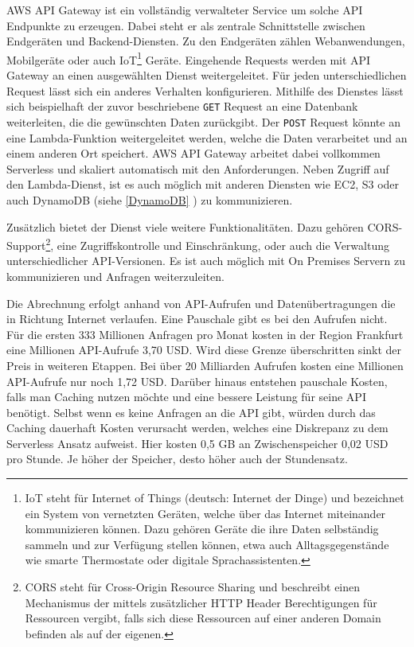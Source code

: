 AWS API Gateway ist ein vollständig verwalteter Service um solche API Endpunkte zu erzeugen.
Dabei steht er als zentrale Schnittstelle zwischen Endgeräten und Backend-Diensten.
Zu den Endgeräten zählen Webanwendungen, Mobilgeräte oder auch
IoT\footnote{IoT steht für Internet of Things (deutsch: Internet der Dinge) und bezeichnet ein System von vernetzten Geräten, welche
 über das Internet miteinander kommunizieren können. Dazu gehören Geräte die ihre Daten selbständig sammeln und zur Verfügung stellen können,
 etwa auch Alltagsgegenstände wie smarte Thermostate oder digitale Sprachassistenten. } Geräte.
Eingehende Requests werden mit API Gateway an einen ausgewählten Dienst weitergeleitet.
Für jeden unterschiedlichen Request lässt sich ein anderes Verhalten konfigurieren.
Mithilfe des Dienstes lässt sich beispielhaft der zuvor beschriebene \verb+GET+ Request an eine Datenbank weiterleiten, die die gewünschten Daten zurückgibt.
Der \verb+POST+ Request könnte an eine Lambda-Funktion weitergeleitet werden, welche die Daten verarbeitet und an einem anderen Ort speichert.
AWS API Gateway arbeitet dabei vollkommen Serverless und skaliert automatisch mit den Anforderungen. Neben Zugriff auf den Lambda-Dienst, ist es auch möglich
mit anderen Diensten wie EC2, S3 oder auch DynamoDB (siehe \ref{DynamoDB} ) zu kommunizieren.

Zusätzlich bietet der Dienst viele weitere Funktionalitäten. Dazu gehören CORS-Support\footnote{CORS steht für Cross-Origin Resource Sharing und
beschreibt einen Mechanismus der mittels zusätzlicher HTTP Header Berechtigungen für Ressourcen vergibt, falls sich diese Ressourcen auf einer anderen
Domain befinden als auf der eigenen.}, eine Zugriffskontrolle und Einschränkung, oder auch die Verwaltung unterschiedlicher
API-Versionen. Es ist auch möglich mit On Premises Servern zu kommunizieren und Anfragen weiterzuleiten.\cite[]{APIGateway}

Die Abrechnung erfolgt anhand von API-Aufrufen und Datenübertragungen die in Richtung Internet verlaufen. Eine Pauschale gibt es bei den Aufrufen nicht.
Für die ersten 333 Millionen Anfragen pro Monat kosten in der Region Frankfurt eine Millionen API-Aufrufe 3,70 USD.
Wird diese Grenze überschritten sinkt der Preis in weiteren Etappen. Bei über 20 Milliarden Aufrufen kosten eine Millionen API-Aufrufe nur noch 1,72 USD.
Darüber hinaus entstehen pauschale Kosten, falls man Caching nutzen möchte und eine bessere Leistung für seine API benötigt.
Selbst wenn es keine Anfragen an die API gibt, würden durch das Caching dauerhaft Kosten verursacht werden, welches eine Diskrepanz zu dem Serverless Ansatz aufweist.
Hier kosten 0,5 GB an Zwischenspeicher 0,02 USD pro Stunde. Je höher der Speicher, desto höher auch der Stundensatz.
\cite[]{APIGWPrice}

